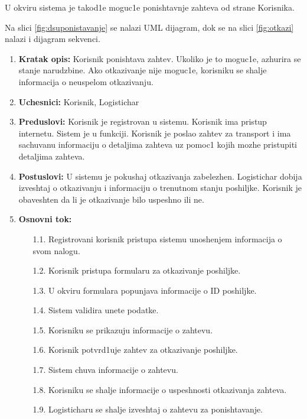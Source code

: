 
U okviru sistema je takod1e moguc1e ponishtavnje zahteva od strane Korisnika.

Na slici \ref{fig:dsuponistavanje} se nalazi UML dijagram, dok se na slici \ref{fig:otkazi} nalazi i dijagram sekvenci.


\begin{enumerate}
    \item \textbf{Kratak opis:} Korisnik ponishtava zahtev. Ukoliko je to moguc1e, azhurira se stanje narudzbine. Ako otkazivanje nije moguc1e, korisniku se shalje informacija o neuspelom otkazivanju.
    
    \item \textbf{Uchesnici:} Korisnik, Logistichar
    \item \textbf{Preduslovi:} Korisnik je registrovan u sistemu. Korisnik ima pristup internetu. Sistem je u funkciji. Korisnik je poslao zahtev za transport i ima sachuvanu informaciju o detaljima zahteva uz pomoc1 kojih mozhe pristupiti detaljima zahteva.
    
    \item \textbf{Postuslovi:} U sistemu je pokushaj otkazivanja zabelezhen. Logistichar dobija izveshtaj o otkazivanju i informaciju o trenutnom stanju poshiljke. Korisnik je obaveshten da li je otkazivanje bilo uspeshno ili ne. 
    \item \textbf{Osnovni tok:}
        \begin{enumerate}
            \item[1.1.] Registrovani korisnik pristupa sistemu unoshenjem informacija o svom nalogu.
            
            \item[1.2.] Korisnik pristupa formularu za otkazivanje poshiljke.
            \item[1.3.] U okviru formulara popunjava informacije o ID poshiljke.
            \item[1.4.] Sistem validira unete podatke.
            \item[1.5.] Korisniku se prikazuju informacije o zahtevu.
            \item[1.6.] Korisnik potvrd1uje zahtev za otkazivanje poshiljke. 
            \item[1.7.] Sistem chuva informacije o zahtevu.
            \item[1.8.] Korisniku se shalje informacije o uspeshnosti otkazivanja zahteva.
            \item[1.9.] Logisticharu se shalje izveshtaj o zahtevu za ponishtavanje.
            

\end{enumerate}
\end{enumerate}
